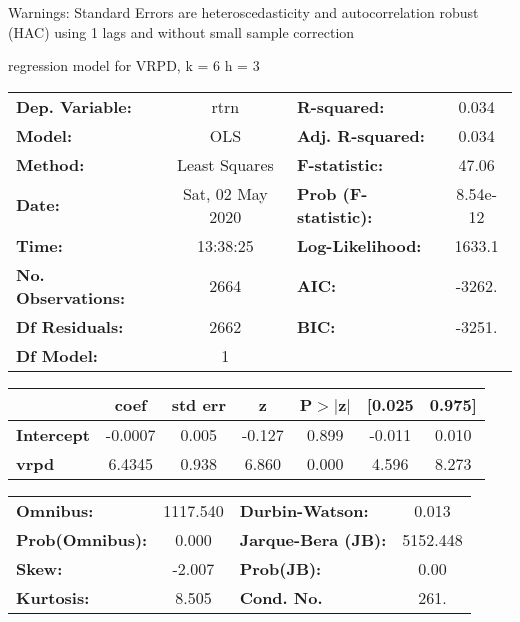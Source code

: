 Warnings: \newline
 [1] Standard Errors are heteroscedasticity and autocorrelation robust (HAC) using 1 lags and without small sample correction\ 

regression model for VRPD, k = 6 h = 3\begin{center}
\begin{tabular}{lclc}
\toprule
\textbf{Dep. Variable:}    &       rtrn       & \textbf{  R-squared:         } &     0.034   \\
\textbf{Model:}            &       OLS        & \textbf{  Adj. R-squared:    } &     0.034   \\
\textbf{Method:}           &  Least Squares   & \textbf{  F-statistic:       } &     47.06   \\
\textbf{Date:}             & Sat, 02 May 2020 & \textbf{  Prob (F-statistic):} &  8.54e-12   \\
\textbf{Time:}             &     13:38:25     & \textbf{  Log-Likelihood:    } &    1633.1   \\
\textbf{No. Observations:} &        2664      & \textbf{  AIC:               } &    -3262.   \\
\textbf{Df Residuals:}     &        2662      & \textbf{  BIC:               } &    -3251.   \\
\textbf{Df Model:}         &           1      & \textbf{                     } &             \\
\bottomrule
\end{tabular}
\begin{tabular}{lcccccc}
                   & \textbf{coef} & \textbf{std err} & \textbf{z} & \textbf{P$> |$z$|$} & \textbf{[0.025} & \textbf{0.975]}  \\
\midrule
\textbf{Intercept} &      -0.0007  &        0.005     &    -0.127  &         0.899        &       -0.011    &        0.010     \\
\textbf{vrpd}      &       6.4345  &        0.938     &     6.860  &         0.000        &        4.596    &        8.273     \\
\bottomrule
\end{tabular}
\begin{tabular}{lclc}
\textbf{Omnibus:}       & 1117.540 & \textbf{  Durbin-Watson:     } &    0.013  \\
\textbf{Prob(Omnibus):} &   0.000  & \textbf{  Jarque-Bera (JB):  } & 5152.448  \\
\textbf{Skew:}          &  -2.007  & \textbf{  Prob(JB):          } &     0.00  \\
\textbf{Kurtosis:}      &   8.505  & \textbf{  Cond. No.          } &     261.  \\
\bottomrule
\end{tabular}
\end{center}

